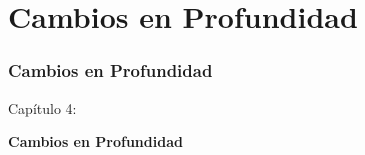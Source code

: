 %

\section{Cambios en Profundidad}
\begin{frame}[fragile]
	\frametitle{Cambios en Profundidad}

	\begin{center}\huge{Capítulo 4:}\end{center}
	\begin{center}\huge{\color{typo3darkgrey}\textbf{Cambios en Profundidad}}\end{center}

\end{frame}


